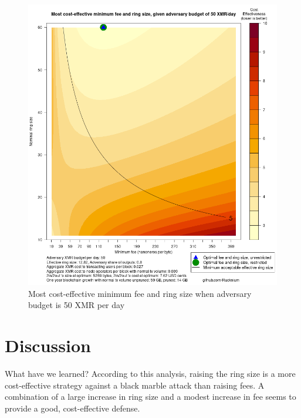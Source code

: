 \documentclass[english]{article}
\begin{document}
\begin{figure}
\caption{Most cost-effective minimum fee and ring size when adversary budget
is 50 XMR per day}

\label{fig-contour-plot-50-budget}

\includegraphics[scale=0.65]{images/cost-effective-contour-plot-50-budget}
\end{figure}

\begin{landscape}
\footnotesize{

}
\end{landscape}

\section{Discussion}

What have we learned? According to this analysis, raising the ring
size is a more cost-effective strategy against a black marble
attack than raising fees. A combination of a large increase in ring
size and a modest increase in fee seems to provide a good, cost-effective
defense.
\end{document}
